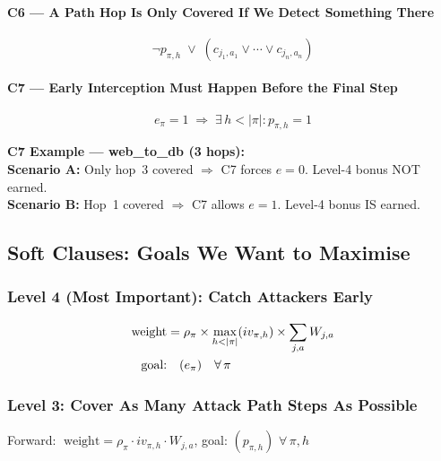 \documentclass[journal]{IEEEtran}
\begin{document}
\paragraph{C6 --- A Path Hop Is Only Covered If We Detect
Something There}
\begin{equation}
  \neg p_{\pi,h} \;\vee\;
  (c_{j_1,a_1} \vee \cdots \vee c_{j_n,a_n})
\end{equation}

\paragraph{C7 --- Early Interception Must Happen Before the
Final Step}
\begin{equation}
  e_\pi = 1 \;\Longrightarrow\;
  \exists\, h < |\pi| : p_{\pi,h} = 1
\end{equation}

\begin{examplebox}
\textbf{C7 Example --- web\_to\_db (3 hops):}\\
\textbf{Scenario A:} Only hop~3 covered $\Rightarrow$
C7 forces $e=0$. Level-4 bonus NOT earned.\\
\textbf{Scenario B:} Hop~1 covered $\Rightarrow$
C7 allows $e=1$. Level-4 bonus IS earned.
\end{examplebox}

\subsection{Soft Clauses: Goals We Want to Maximise}

\subsubsection{Level 4 (Most Important): Catch Attackers Early}
\begin{align}
  \text{weight} &= \rho_\pi \times
    \max_{h < |\pi|}(iv_{\pi,h}) \times
    \sum_{j,a} W_{j,a} \notag \\
  \text{goal:} &\quad (e_\pi) \quad \forall\,\pi
\end{align}

\subsubsection{Level 3: Cover As Many Attack Path Steps
              As Possible}

Forward:
$\;\text{weight} = \rho_\pi \cdot iv_{\pi,h} \cdot W_{j,a}$,
\;goal: $(p_{\pi,h})$ $\forall\,\pi,h$
\end{document}
